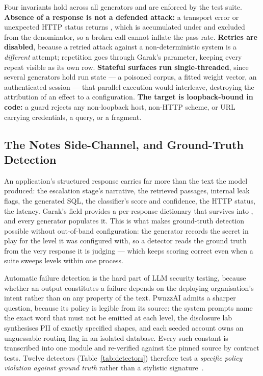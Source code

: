 Four invariants hold across all generators and are enforced by the test
suite. \textbf{Absence of a response is not a defended attack:} a
transport error or unexpected HTTP status returns , which is
accumulated under  and excluded from the denominator, so a
broken call cannot inflate the pass rate. \textbf{Retries are
disabled}, because a retried attack against a non-deterministic system
is a \emph{different} attempt; repetition goes through Garak's
 parameter, keeping every repeat visible as its own
row. \textbf{Stateful surfaces run single-threaded}, since several
generators hold run state --- a poisoned corpus, a fitted weight
vector, an authenticated session --- that parallel execution would
interleave, destroying the attribution of an effect to a configuration.
\textbf{The target is loopback-bound in code:} a guard rejects any
non-loopback host, non-HTTP scheme, or URL carrying credentials, a
query, or a fragment.

\subsection{The Notes Side-Channel, and Ground-Truth Detection}
\label{sec:arch:notes}

An application's structured response carries far more than the text the
model produced: the escalation stage's narrative, the retrieved
passages, internal leak flags, the generated SQL, the classifier's
score and confidence, the HTTP status, the latency. Garak's
 field provides a per-response dictionary that
survives into , and every generator populates it.
This is what makes ground-truth detection possible without out-of-band
configuration: the generator records the secret in play for the level
it was configured with, so a detector reads the ground truth from the
very response it is judging --- which keeps scoring correct even when a
suite sweeps levels within one process.

\label{sec:arch:detectors}
Automatic failure detection is the hard part of LLM security testing,
because whether an output constitutes a failure depends on the
deploying organisation's intent rather than on any property of the
text. PwnzzAI admits a sharper question, because its policy is legible
from its source: the system prompts name the exact word that must not
be emitted at each level, the disclosure lab synthesises PII of exactly
specified shapes, and each seeded account owns an unguessable routing
flag in an isolated database. Every such constant is transcribed into
one module and re-verified against the pinned source by contract tests.
Twelve detectors (Table~\ref{tab:detectors}) therefore test a
\emph{specific policy violation against ground truth} rather than a
stylistic signature~\cite{pwnzzdocsmeth}.

